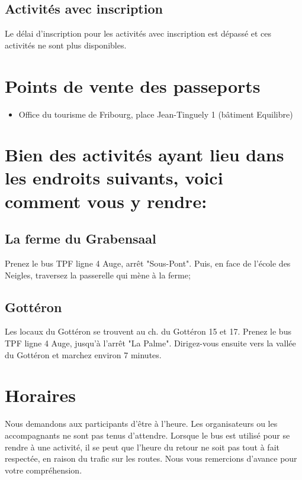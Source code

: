 \subsection*{Activités avec inscription}

Le délai d'inscription pour les activités avec inscription est dépassé et ces activités ne sont plus disponibles.


\section*{Points de vente des passeports}

\begin{itemize}
\item Office du tourisme de Fribourg, place Jean-Tinguely 1 (bâtiment Equilibre)
\end{itemize}

\section*{Bien des activités ayant lieu dans les endroits suivants, voici comment vous y rendre:}

\subsection*{La ferme du Grabensaal}

Prenez le bus TPF ligne 4 Auge, arrêt "Sous-Pont". Puis, en face de l'école des Neigles, traversez la passerelle qui mène à la ferme;

\subsection*{Gottéron}

Les locaux du Gottéron se trouvent au ch. du Gottéron 15 et 17. Prenez le bus TPF ligne 4 Auge, jusqu'à l'arrêt "La Palme". Dirigez-vous ensuite vers la vallée du Gottéron et marchez environ 7 minutes. 

\section*{Horaires}

Nous demandons aux participants d'être à l'heure. Les organisateurs ou les accompagnants ne sont pas tenus d'attendre. Lorsque le bus est utilisé pour se rendre à une activité, il se peut que l'heure du retour ne soit pas tout à fait respectée, en raison du trafic sur les routes. Nous vous remercions d'avance pour votre compréhension.

